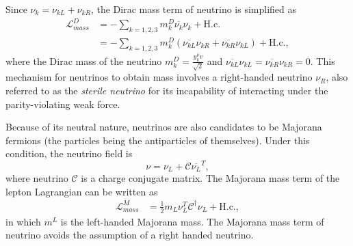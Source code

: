     Since $\nu_k = \nu_{kL} + \nu_{kR}$, the Dirac mass term of neutrino is simplified as
\begin{equation}\label{eq8}
\begin{aligned}
    \mathscr{L}^D_{mass} &= -\sum\limits_{k = 1, 2, 3} m_k^D\overline{\nu_{k}}\nu_{k} + \textrm{H.c.} \\
    & = -\sum\limits_{k = 1, 2, 3}m_k^D(\overline{\nu_{kL}}\nu_{kR} + \overline{\nu_{kR}}\nu_{kL}) + \textrm{H.c.},
\end{aligned}
\end{equation}
    where the Dirac mass of the neutrino $m_k^D = \frac{y_k^\nu v}{\sqrt{2}}$ and $\overline{\nu_{kL}}\nu_{kL} = \overline{\nu_{kR}}\nu_{kR} = 0$.
    This mechanism for neutrinos to obtain mass involves a right-handed neutrino $\nu_R$, also referred to as the \textit{sterile neutrino} for its incapability of interacting under the parity-violating weak force.
    
    Because of its neutral nature, neutrinos are also candidates to be Majorana fermions (the particles being the antiparticles of themselves).
    Under this condition, the neutrino field is
    \begin{equation}\label{eq9}
        \nu = \nu_L + \mathcal{C}\overline{\nu_L}^T,
    \end{equation}
    where neutrino $\mathcal{C}$ is a charge conjugate matrix.
    The Majorana mass term of the lepton Lagrangian can be written as 
    \begin{equation}\label{eq10}
\begin{aligned}
    \mathscr{L}^M_{mass} &= \frac{1}{2}m_L{\nu_{L}^T} \mathcal{C}^\dagger \nu_{L} + \textrm{H.c.},
\end{aligned}
\end{equation}
    in which $m^L$ is the left-handed Majorana mass.
    The Majorana mass term of neutrino avoids the assumption of a right handed neutrino.
    
